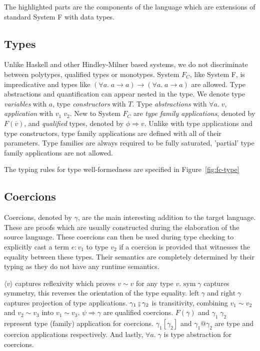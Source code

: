 The highlighted parts are the components of the language which are extensions of
standard System F with data types.

\subsection{Types}

Unlike Haskell and other Hindley-Milner based systems, we do not discriminate
between polytypes, qualified types or monotypes. System $F_C$, like System F, is
impredicative and types like $(\forall a. \; a \rightarrow a) \rightarrow
(\forall a. \; a \rightarrow a)$ are allowed. Type abstractions and
quantification can appear nested in the type. We denote type \textit{variables}
with $a$, type \textit{constructors} with $T$. Type \textit{abstractions} with
$\forall a. \; v$, \textit{application} with $v_1 \; v_2$. New to System $F_C$
are \textit{type family applications}, denoted by $F(\overline{v})$, and
\textit{qualified} types, denoted by $\phi \Rightarrow v$. Unlike with type
applications and type constructors, type family applications are defined with
all of their parameters. Type families are always required to be fully
saturated, 'partial' type family applications are not allowed.

The typing rules for type well-formedness are specified in
Figure~\ref{fig:fc-type}

\subsection{Coercions}

Coercions, denoted by $\gamma$, are the main interesting addition to the target
language. These are proofs which are usually constructed during the elaboration
of the source language. These coercions can then be used during type checking to
explicitly cast a term $e : v_1$ to type $v_2$ if a coercion is provided that
witnesses the equality between these types. Their semantics are completely
determined by their typing as they do not have any runtime semantics.

$\langle v \rangle$ captures reflexivity which proves $v \sim v$ for any
type $v$. $\text{sym} \; \gamma$ captures symmetry, this reverses the
orientation of the type equality. $\text{left} \; \gamma$ and $\text{right} \;
\gamma$ captures projection of type applications.
$\gamma_1 \fctrans \gamma_2$ is transitivity, combining $v_1 \sim v_2$ and $v_2
\sim v_3$ into $v_1 \sim v_3$. $\psi \Rightarrow \gamma$ are qualified
coercions. $F(\overline{\gamma})$ and $\gamma_1 \; \gamma_2$ represent type
(family) application for coercions. $\gamma_1[\gamma_2]$ and $\gamma_1@\gamma_2$
are type and coercion applications respectively. And lastly, $\forall a. \;
\gamma$ is type abstraction for coercions.

